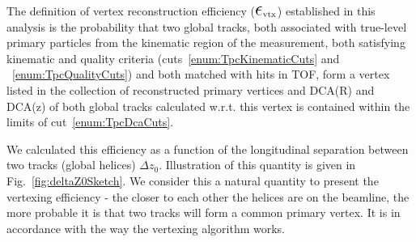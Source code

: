 The definition of vertex reconstruction efficiency ($\mbox{\LARGE$\epsilon$}_{\text{vtx}}$) established in this analysis is the probability that two global tracks, both associated with true-level primary particles from the kinematic region of the measurement, both satisfying kinematic and quality criteria (cuts~\ref{enum:TpcKinematicCuts} and ~\ref{enum:TpcQualityCuts}) and both matched with hits in TOF, form a vertex listed in the collection of reconstructed primary vertices and DCA(R) and DCA(z) of both global tracks calculated w.r.t. this vertex is contained within the limits of cut~\ref{enum:TpcDcaCuts}.

We calculated this efficiency as a function of the longitudinal separation between two tracks (global helices) $\Delta z_{0}$. Illustration of this quantity is given in Fig.~\ref{fig:deltaZ0Sketch}. We consider this a natural quantity to present the vertexing efficiency - the closer to each other the helices are on the beamline, the more probable it is that two tracks will form a common primary vertex. It is in accordance with the way the vertexing algorithm works.



